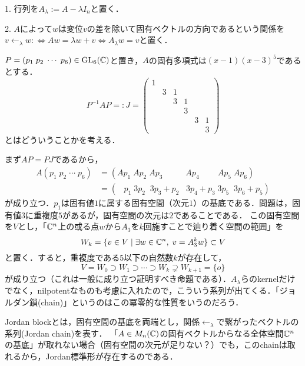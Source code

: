 \documentclass[uplatex,dvipdfmx]{jsreport}
\begin{document}
\begin{notation}
    1. 行列を$A_\lambda := A-\lambda I_n$と置く．

    2. $A$によって$w$は変位$v$の差を除いて固有ベクトルの方向であるという関係を$v\leftarrow_\lambda w:\Leftrightarrow Aw=\lambda w+v\Leftrightarrow A_\lambda w=v$と置く．
\end{notation}
\begin{example}[$A\in M_6(\C)$のJordan標準形の求め方]
    $P=(p_1\;p_2\;\cdots\;p_6)\in\mathrm{GL}_6(\mathbb{C})$と置き，$A$の固有多項式は$(x-1)(x-3)^5$であるとする．
    \[ P^{-1}AP =: J = \begin{pmatrix}1&&&&&\\ &3&1&&&\\ &&3&1&&\\ &&&3&&\\ &&&&3&1\\ &&&&&3\end{pmatrix} \]
    とはどういうことかを考える．

    まず$AP=PJ$であるから，
    \begin{align*}
        A(p_1\;p_2\;\cdots\;p_6) &= (Ap_1\;Ap_2\;Ap_3\;\;\;\;\;\;\;\;\;\;Ap_4\;\;\;\;\;\;\;\;Ap_5\;Ap_6)\\
        &= (\;\;\;p_1\;3p_2\;\;3p_3+p_2\;\;\;3p_4+p_3\;3p_5\;\;3p_6+p_5)
    \end{align*}
    が成り立つ．$p_1$は固有値$1$に属する固有空間（次元$1$）の基底である．問題は，固有値$3$に重複度$5$があるが，固有空間の次元は$2$であることである．
    この固有空間を$V$とし，「$\mathbb{C}^n$上の或る点$w$から$A_3$を$k$回施すことで辿り着く空間の範囲」を
    \[ W_k=\{ v\in V\mid \exists w\in\mathbb{C}^n,\; v=A_3^kw \}\subset V \]
    と置く．すると，重複度である$5$以下の自然数$k$が存在して，
    \[ V=W_0\supset W_1\supset\cdots\supset W_k\supsetneq W_{k+1}=\{o\} \]
    が成り立つ（これは一般に成り立つ証明すべき命題である）．$A_\lambda$らのkernelだけでなく，nilpotentなものも考慮に入れたので，こういう系列が出てくる．「ジョルダン鎖(chain)」というのはこの冪零的な性質をいうのだろう．

\end{example}

\begin{screen}
    Jordan blockとは，固有空間の基底を両端とし，関係$\leftarrow_\lambda$で繋がったベクトルの系列(Jordan chain)を表す．
    「$A\in M_n(\mathbb{C})$の固有ベクトルからなる全体空間$\mathbb{C}^n$の基底」が取れない場合（固有空間の次元が足りない？）でも，このchainは取れるから，Jordan標準形が存在するのである．
\end{screen}
\end{document}
